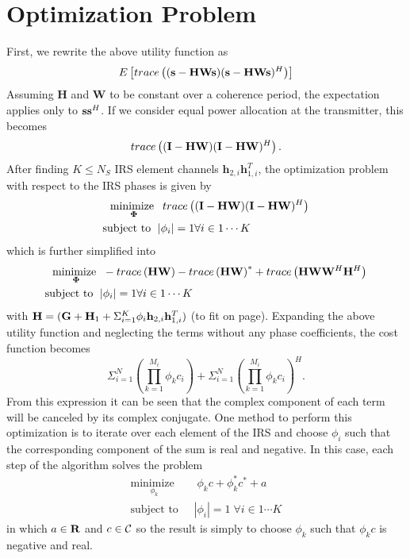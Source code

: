 \documentclass[12pt,a4paper]{report}
\begin{document}
\section{Optimization Problem}
First, we rewrite the above utility function as
	\begin{equation}
E\left[ \mathop{trace}\left((\mathbf{s} - \mathbf{H}\mathbf{W}\mathbf{s})(\mathbf{s} - \mathbf{H}\mathbf{W}\mathbf{s})^H \right)\right]
\end{equation}
Assuming $\mathbf{H}$ and $\mathbf{W}$ to be constant over a coherence period, the expectation applies only to $\mathbf{s} \mathbf{s}^H$. If we consider equal power allocation at the transmitter, this becomes
	\begin{equation}
\mathop{trace}\left((\mathbf{I} - \mathbf{H}\mathbf{W})(\mathbf{I} - \mathbf{H}\mathbf{W})^H \right).
\end{equation}
After finding $K \leq N_S$ IRS element channels $\mathbf{h}_{2,i}\mathbf{h}^T_{1,i}$, the optimization problem with respect to the IRS phases is given by
	\begin{align}
	    \underset{\boldsymbol{\Phi}}{\text{minimize }}
	    & \; \mathop{trace}\left((\mathbf{I} - \mathbf{H}\mathbf{W})
	   (\mathbf{I} - \mathbf{H}\mathbf{W})^H \right)
	     \\
	    \text{subject to  } \; &
	    | \phi_i | = 1  \forall i \in {1 \cdots	 K}
	\end{align}\label{mse_problem}
	which is further simplified into
		\begin{align}
	    \underset{\boldsymbol{\Phi}}{\text{minimize }}
	    & \; - \mathop{trace} \left( \mathbf{H}\mathbf{W}\right) - \mathop{trace} \left( \mathbf{H}\mathbf{W}\right)^* +
	    \mathop{trace}\left(\mathbf{H}\mathbf{W} \mathbf{W}^H \mathbf{H}^H\right)
	     \\
	    \text{subject to  } \; &
	    | \phi_i | = 1  \forall i \in {1 \cdots	 K}
	\end{align}\label{mse_problem_full}
	with $\mathbf{H} = (\mathbf{G} +  \mathbf{H}_1 + \Sigma_{i=1}^{K} \phi_i \mathbf{h}_{2,i}\mathbf{h}^T_{1,i})$ (to fit on page).
	Expanding the above utility function and neglecting the terms without any phase coefficients, the cost function becomes
	\begin{equation}
	\Sigma_{i=1}^{N} \left(\prod_{k=1}^{M_i}\phi_{k} c_i \right ) +  \Sigma_{i=1}^{N} \left(\prod_{k=1}^{M_i}\phi_{k} c_i \right)^H.
	\end{equation}
	From this expression it can be seen that the complex component of each term will be canceled by its complex conjugate.
	One method to perform this optimization is to iterate over each element of the IRS and choose $\phi_{i}$ such that 
	the corresponding component of the sum is real and negative. In this case, each step of the algorithm solves the problem
			\begin{align}
	    \underset{\phi_k}{\text{minimize }}
	    & \; \phi_k c + \phi_k^* c^* + a 
	     \\
	    \text{subject to  } \; &
	    | \phi_i | = 1   \; \forall i \in {1 \cdots	 K}
	\end{align}\label{mse_problem_s}
	in which $a \in {\mbox{\bf R}}$ and $c \in \mathcal{C}$ so the result is simply to choose $\phi_k$ such that $\phi_k c$ is negative and real.
\end{document}
